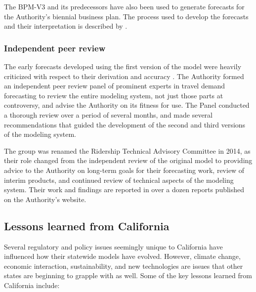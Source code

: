 The BPM-V3 and its predecessors have also been used to generate forecasts for the Authority's biennial business plan. The process used to develop the forecasts and their interpretation is described by \cite{cambridge16b}.

\subsubsection{Independent peer review}

The early forecasts developed using the first version of the model were heavily criticized with respect to their derivation and accuracy \citep{brownstone10}. The Authority formed an independent peer review panel of prominent experts in travel demand forecasting to review the entire modeling system, not just those parts at controversy, and advise the Authority on its fitness for use. The Panel conducted a thorough review over a period of several months, and made several recommendations that guided the development of the second and third versions of the modeling system.

The group was renamed the Ridership Technical Advisory Committee in 2014, as their role changed from the independent review of the original model to providing advice to the Authority on long-term goals for their forecasting work, review of interim products, and continued review of technical aspects of the modeling system. Their work and findings are reported in over a dozen reports published on the Authority's website.

\subsection{Lessons learned from California}

Several regulatory and policy issues seemingly unique to California have influenced how their statewide models have evolved. However, climate change, economic interaction, sustainability, and new technologies are issues that other states are beginning to grapple with as well. Some of the key lessons learned from California include:

